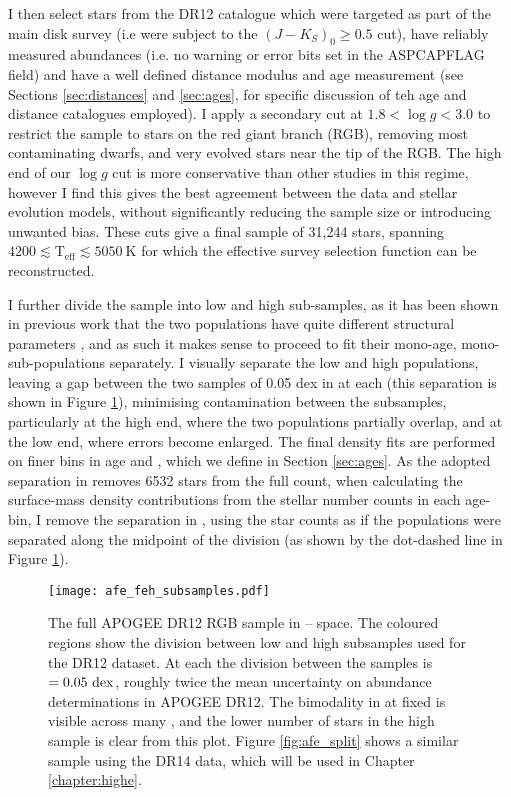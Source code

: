 I then select stars from the DR12 catalogue which were targeted as part of the main disk survey (i.e were subject to the $(J-K_S)_0 \geq 0.5$ cut), have reliably measured abundances (i.e. no warning or error bits set in the ASPCAPFLAG field) and have a well defined distance modulus and age measurement (see Sections \ref{sec:distances} and \ref{sec:ages}, for specific discussion of teh age and distance catalogues employed). I apply a secondary cut at $1.8 < \log{g} < 3.0$ to restrict the sample to stars on the red giant branch (RGB), removing most contaminating dwarfs, and very evolved stars near the tip of the RGB. The high end of our $\log{g}$ cut is more conservative than other studies in this regime, however I find this gives the best agreement between the data and stellar evolution models, without significantly reducing the sample size or introducing unwanted bias. These cuts give a final sample of 31,244 stars, spanning $4200 \lesssim \mathrm{T_{\mathrm{eff}}} \lesssim  5050\ \mathrm{K}$ for which the effective survey selection function can be reconstructed.

I further divide the sample into low and high \afe{} sub-samples, as it has been shown in previous work that the two populations have quite different structural parameters \citep{2016ApJ...823...30B}, and as such it makes sense to proceed to fit their mono-age, mono-\feh{} sub-populations separately. I visually separate the low and high \afe{} populations, leaving a gap between the two samples of 0.05 dex in \afe{} at each \feh{} (this separation is shown in Figure \ref{fig:afe_feh}), minimising contamination between the subsamples, particularly at the high \feh{} end, where the two populations partially overlap, and at the low \feh{} end, where \afe{} errors become enlarged. The final density fits are performed on finer bins in age and \feh{}, which we define in Section \ref{sec:ages}. As the adopted separation in \afe{} removes 6532 stars from the full count, when calculating the surface-mass density contributions from the stellar number counts in each age-\feh{} bin, I remove the separation in \afe{}, using the star counts as if the populations were separated along the midpoint of the division (as shown by the dot-dashed line in Figure \ref{fig:afe_feh}). 

 \begin{figure}
  \centering
 	\texttt{[image: afe\_feh\_subsamples.pdf]}
    \caption[\afe{}--\feh{} for the APOGEE DR12 sample, demonstrating the division used to divide between high and low \afe{} populations in Chapter \ref{chapter:apogeestruc}]{The full APOGEE DR12 RGB sample in \afe{}--\feh{} space. The coloured regions show the division between low and high \afe{} subsamples used for the DR12 dataset. At each \feh{} the division between the samples is \afe{} $= 0.05 \ \rm{dex}$, roughly twice the mean uncertainty on \afe{} abundance determinations in APOGEE DR12. The bimodality in \afe{} at fixed \feh{} is visible across many \feh{}, and the lower number of stars in the high \afe{} sample is clear from this plot. Figure \ref{fig:afe_split} shows a similar sample using the DR14 data, which will be used in Chapter \ref{chapter:highe}.}
 \label{fig:afe_feh}
\end{figure}


